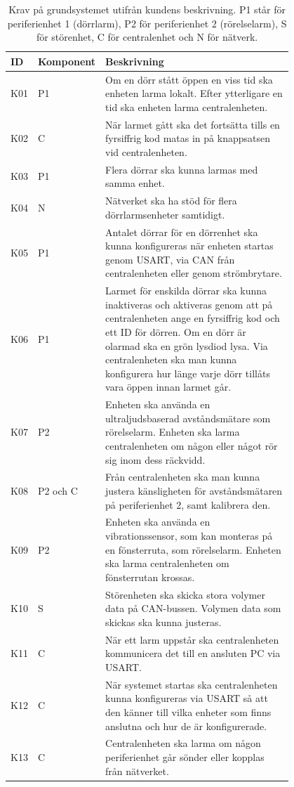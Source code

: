 \begin{table}[h!]
\caption{Krav på grundsystemet utifrån kundens beskrivning. P1 står för periferienhet 1 (dörrlarm), P2 för periferienhet 2 (rörelselarm), S för störenhet, C för centralenhet och N för nätverk.}
\label{tabell:krav}
\centering
\begin{tabular}{| l | l | p{0.8\linewidth}|}
\hline
\textbf{ID} & \textbf{Komponent} & \textbf{Beskrivning} \\ \hline
K01 & P1 & Om en dörr stått öppen en viss tid ska enheten larma lokalt. Efter ytterligare en tid ska enheten larma centralenheten. \\ \hline
K02 & C & När larmet gått ska det fortsätta tills en fyrsiffrig kod matas in på knappsatsen vid centralenheten. \\ \hline
K03 & P1 & Flera dörrar ska kunna larmas med samma enhet. \\ \hline
K04 & N & Nätverket ska ha stöd för flera dörrlarmsenheter samtidigt. \\ \hline
K05 & P1 & Antalet dörrar för en dörrenhet ska kunna konfigureras när enheten startas genom  USART,  via  CAN  från  centralenheten  eller genom strömbrytare. \\ \hline
K06 & P1 & Larmet för enskilda dörrar ska kunna inaktiveras och aktiveras genom att på centralenheten ange en fyrsiffrig kod och ett ID för dörren. Om en dörr är olarmad ska en grön lysdiod lysa. Via centralenheten ska man kunna konfigurera hur länge varje dörr tillåts vara öppen innan larmet går. \\ \hline
K07 & P2 & Enheten ska använda en ultraljudsbaserad avståndsmätare som rörelselarm. Enheten ska larma centralenheten om någon eller något rör sig inom dess räckvidd. \\ \hline
K08 & P2 och C & Från  centralenheten  ska  man  kunna  justera  känsligheten  för avståndsmätaren på periferienhet 2, samt kalibrera den. \\ \hline
K09 & P2 & Enheten ska använda en vibrationssensor, som kan monteras på en fönsterruta, som rörelselarm. Enheten ska larma centralenheten om fönsterrutan krossas. \\ \hline
K10 & S & Störenheten ska skicka stora volymer data på CAN-bussen. Volymen data som skickas ska kunna justeras. \\ \hline
K11 & C & När ett larm uppstår ska centralenheten kommunicera det till en ansluten PC via  USART. \\ \hline
K12 & C & När  systemet  startas  ska  centralenheten  kunna  konfigureras  via  USART  så  att  den känner till vilka enheter som finns anslutna och hur de är konfigurerade. \\ \hline
K13 & C & Centralenheten ska larma om någon periferienhet går sönder eller kopplas från nätverket. \\ \hline
\end{tabular}
\end{table}


